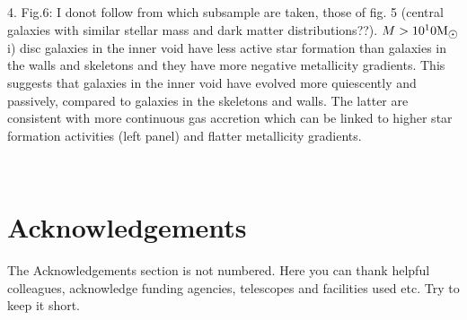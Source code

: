 \documentclass[a4paper,fleqn,usenatbib,letter]{mnras}
\newcommand{\Msun}{\rm M_{\sun}}
\begin{document}
4. Fig.6: I donot follow from which subsample are taken, those of fig. 5 (central galaxies with similar stellar mass and dark matter distributions??).
$M>10^10\Msun$
i) disc galaxies in the inner void have less active star formation than galaxies in the walls and skeletons and they have more negative metallicity gradients.
This suggests that galaxies in the inner void have evolved more quiescently and  passively, compared to galaxies in the skeletons and walls.
The latter are consistent with more continuous gas accretion which can be linked to higher star formation activities (left panel) and flatter metallicity gradients.

~                                                                                      


\section*{Acknowledgements}

The Acknowledgements section is not numbered. Here you can thank helpful
colleagues, acknowledge funding agencies, telescopes and facilities used etc.
Try to keep it short.




%


\end{document}
